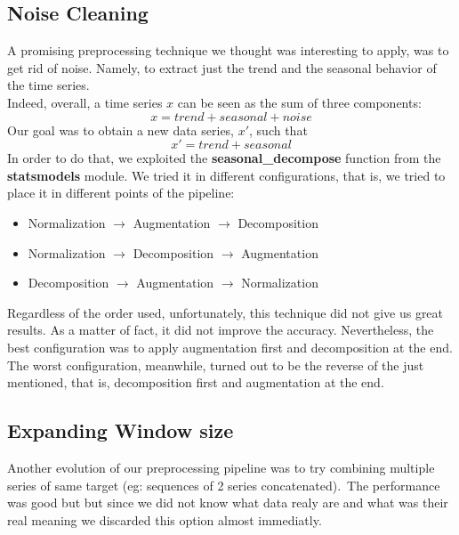 \documentclass[11pt]{article}
\begin{document}
\subsection{Noise Cleaning}
A promising preprocessing technique we thought was interesting to apply, was to get rid of noise. Namely, to extract just the trend and the seasonal behavior of the time series. \\
Indeed, overall, a time series $x$ can be seen as the sum of three components:
\begin{equation*}
    x = trend + seasonal + noise
\end{equation*}
Our goal was to obtain a new data series, $x'$, such that
\begin{equation*}
    x' = trend + seasonal
\end{equation*}
In order to do that, we exploited the \textbf{seasonal\_decompose} function from the \textbf{statsmodels} module. We tried it in different configurations, that is, we tried to place it in different points of the pipeline:
\begin{itemize}
    \item Normalization $\rightarrow$ Augmentation $\rightarrow$ Decomposition
    \item Normalization $\rightarrow$ Decomposition $\rightarrow$ Augmentation
    \item Decomposition $\rightarrow$ Augmentation $\rightarrow$ Normalization
\end{itemize}
Regardless of the order used, unfortunately, this technique did not give us great results. As a matter of fact, it did not improve the accuracy. Nevertheless, the best configuration was to apply augmentation first and decomposition at the end. The worst configuration, meanwhile, turned out to be the reverse of the just mentioned, that is, decomposition first and augmentation at the end.
\subsection{Expanding Window size}
Another evolution of our preprocessing pipeline was to try combining multiple series of same target (eg: sequences of 2 series concatenated).\
The performance was good but  but since we did not know what data realy are and what was their real meaning we discarded this option almost immediatly.
\end{document}
